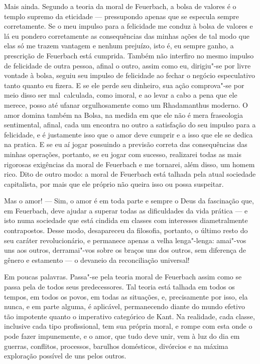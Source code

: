 Mais ainda. Segundo a teoria da moral %
de Feuerbach,
a bolsa de valores é o templo supremo da eticidade --- 
pressupondo apenas que se especula sempre corretamente. Se o meu impulso
para a felicidade me conduz à bolsa de valores e lá eu pondero
corretamente as consequências das minhas ações de tal modo que elas só
me trazem vantagem e nenhum prejuízo, isto é, eu sempre ganho, a
prescrição
de Feuerbach está
cumprida. Também não interfiro no mesmo impulso de felicidade de outra
pessoa, afinal o outro, assim como eu, dirigiu"-se por livre vontade à
bolsa, seguiu seu impulso de felicidade ao fechar o negócio especulativo
tanto quanto eu fizera. E se ele perde seu dinheiro, sua ação
comprova"-se por meio disso ser mal\est\ calculada, como imoral,
e ao levar a cabo a pena que ele merece, posso até
ufanar orgulhosamente como um Rhadamanthus moderno. O amor domina também
na Bolsa, na medida em que ele não é mera fraseologia sentimental,
afinal, cada um encontra no outro a satisfação do seu impulso para a
felicidade, e é justamente isso que o amor deve cumprir e a isso que ele
se dedica na pratica. E se eu aí jogar possuindo a previsão correta das
consequências das minhas operações, portanto, se eu jogar com sucesso,
realizarei todas as mais rigorosas exigências da moral
de Feuerbach e
me tornarei, além disso, um homem rico. \textbar{} Dito de outro modo: a moral
de Feuerbach está
talhada pela atual sociedade capitalista, por mais que ele próprio não
queira isso ou possa suspeitar.\textbar{}

Mas o amor! --- Sim, o amor é em toda parte e sempre o Deus da fascinação
que,
em Feuerbach,
deve ajudar a superar todas as dificuldades da vida prática --- e isto
numa sociedade que está cindida em classes com interesses diametralmente
contrapostos. Desse modo, desapareceu da filosofia, portanto, o último %
resto do seu caráter revolucionário, e permanece apenas a velha
lenga"-lenga: amai"-vos uns aos outros, derramai"-vos sobre os braços uns
dos outros, sem diferença de gênero e estamento --- o devaneio da
reconciliação universal!

Em poucas palavras. Passa"-se pela teoria moral %
de Feuerbach
assim como se passa pela de todos seus predecessores. Tal teoria está
talhada em todos os tempos, em todos os povos, em todas as situações, e,
precisamente por isso, ela nunca, e em parte alguma, é aplicável,
permanecendo diante do mundo efetivo tão impotente quanto o imperativo
categórico
de Kant.
Na realidade, cada classe, inclusive cada tipo profissional, tem sua
própria moral, e rompe com esta onde o pode fazer impunemente, e o amor,
que tudo deve unir, vem à luz do dia em guerras, conflitos, processos,
barulhos domésticos, divórcios e na máxima exploração possível de uns
pelos outros.

